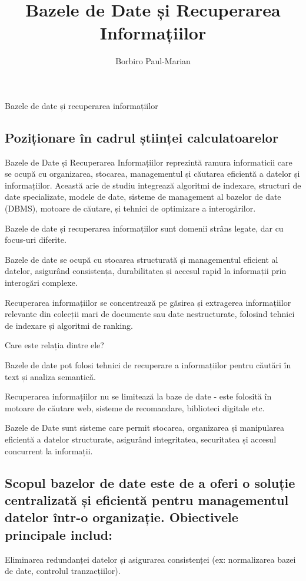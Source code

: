 \documentclass[12pt]{article}
\title{Bazele de Date și Recuperarea Informațiilor}
\author{Borbiro Paul-Marian}
\begin{document}
\maketitle

Bazele de date și recuperarea informațiilor

\subsection*{Poziționare în cadrul științei calculatoarelor}
Bazele de Date și Recuperarea Informațiilor reprezintă ramura informaticii care se ocupă cu organizarea, stocarea, managementul și căutarea eficientă a datelor și informațiilor. Această arie de studiu integrează algoritmi de indexare, structuri de date specializate, modele de date, sisteme de management al bazelor de date (DBMS), motoare de căutare, și tehnici de optimizare a interogărilor.

Bazele de date și recuperarea informațiilor sunt domenii strâns legate, dar cu focus-uri diferite.

Bazele de date se ocupă cu stocarea structurată și managementul eficient al datelor, asigurând consistența, durabilitatea și accesul rapid la informații prin interogări complexe.

Recuperarea informațiilor se concentrează pe găsirea și extragerea informațiilor relevante din colecții mari de documente sau date nestructurate, folosind tehnici de indexare și algoritmi de ranking.

Care este relația dintre ele?

Bazele de date pot folosi tehnici de recuperare a informațiilor pentru căutări în text și analiza semantică.

Recuperarea informațiilor nu se limitează la baze de date - este folosită în motoare de căutare web, sisteme de recomandare, biblioteci digitale etc.

Bazele de Date sunt sisteme care permit stocarea, organizarea și manipularea eficientă a datelor structurate, asigurând integritatea, securitatea și accesul concurrent la informații.

\subsection*{Scopul bazelor de date este de a oferi o soluție centralizată și eficientă pentru managementul datelor într-o organizație. Obiectivele principale includ:}

Eliminarea redundanței datelor și asigurarea consistenței (ex: normalizarea bazei de date, controlul tranzacțiilor).
\end{document}
